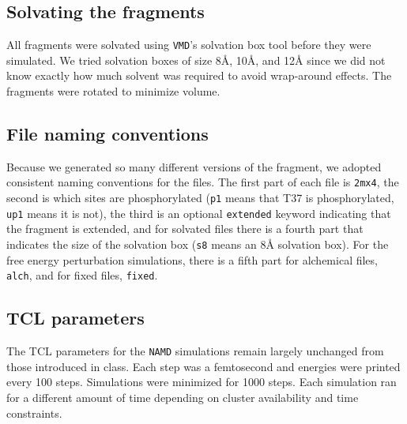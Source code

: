 \subsection{Solvating the fragments}
All fragments were solvated using \texttt{VMD}'s solvation box tool before they were simulated.
We tried solvation boxes of size 8\AA, 10\AA, and 12{\AA} since we did not know exactly how much solvent was required to avoid wrap-around effects.
The fragments were rotated to minimize volume.

\subsection{File naming conventions}
Because we generated so many different versions of the fragment, we adopted consistent naming conventions for the files.
The first part of each file is \texttt{2mx4},
the second is which sites are phosphorylated (\texttt{p1} means that T37 is phosphorylated, \texttt{up1} means it is not),
the third is an optional \texttt{extended} keyword indicating that the fragment is extended,
and for solvated files there is a fourth part that indicates the size of the solvation box (\texttt{s8} means an 8{\AA} solvation box).
For the free energy perturbation simulations, there is a fifth part for alchemical files, \texttt{alch}, and for fixed files, \texttt{fixed}.

\subsection{TCL parameters}
The TCL parameters for the \texttt{NAMD} simulations remain largely unchanged from those introduced in class.
Each step was a femtosecond and energies were printed every 100 steps.
Simulations were minimized for 1000 steps.
Each simulation ran for a different amount of time depending on cluster availability and time constraints.

